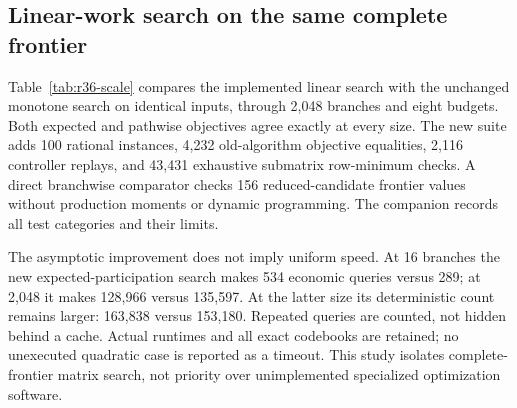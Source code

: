 \subsection{Linear-work search on the same complete frontier}\label{sec:r36-evidence}
Table~\ref{tab:r36-scale} compares the implemented linear search with the unchanged monotone search on identical inputs, through 2,048 branches and eight budgets. Both expected and pathwise objectives agree exactly at every size. The new suite adds 100 rational instances, 4,232 old-algorithm objective equalities, 2,116 controller replays, and 43,431 exhaustive submatrix row-minimum checks. A direct branchwise comparator checks 156 reduced-candidate frontier values without production moments or dynamic programming. The companion records all test categories and their limits.

The asymptotic improvement does not imply uniform speed. At 16 branches the new expected-participation search makes 534 economic queries versus 289; at 2,048 it makes 128,966 versus 135,597. At the latter size its deterministic count remains larger: 163,838 versus 153,180. Repeated queries are counted, not hidden behind a cache. Actual runtimes and all exact codebooks are retained; no unexecuted quadratic case is reported as a timeout. This study isolates complete-frontier matrix search, not priority over unimplemented specialized optimization software.
